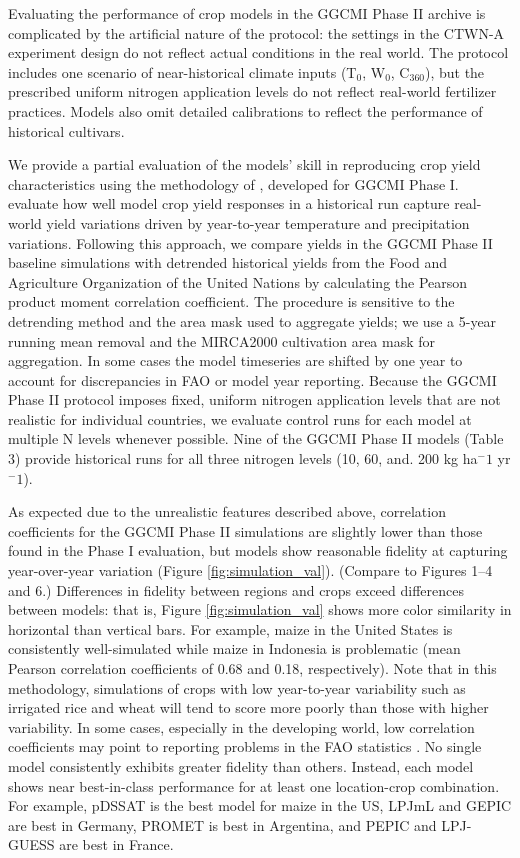 \documentclass[gmd, manuscript]{copernicus} %
\begin{document}
Evaluating the performance of crop models in the GGCMI Phase II archive is complicated by the artificial nature of the protocol: the settings in the CTWN-A experiment design do not reflect actual conditions in the real world. 
The protocol includes one scenario of near-historical climate inputs (T$_0$, W$_0$, C$_{360}$), but the prescribed uniform nitrogen application levels do not reflect real-world fertilizer practices. Models also omit detailed calibrations to reflect the performance of historical cultivars. 

We provide a partial evaluation of the models’ skill in reproducing crop yield characteristics using the methodology of \citet{muller_global_2017}, developed for GGCMI Phase I.
\citet{muller_global_2017} evaluate how well model crop yield responses in a historical run capture real-world yield variations driven by year-to-year temperature and precipitation variations. 
Following this approach, we compare yields in the GGCMI Phase II baseline simulations with detrended historical yields from the Food and Agriculture Organization of the United Nations \citep{FAOSTAT} by calculating the Pearson product moment correlation coefficient. 
The procedure is sensitive to the detrending method and the area mask used to aggregate yields; we use a 5-year running mean removal and the MIRCA2000 cultivation area mask for aggregation. 
In some cases the model timeseries are shifted by one year to account for discrepancies in FAO or model year reporting. 
Because the GGCMI Phase II protocol imposes fixed, uniform nitrogen application levels that are not realistic for individual countries, we evaluate control runs for each model at multiple N levels whenever possible. 
Nine of the GGCMI Phase II models (Table 3) provide historical runs for all three nitrogen levels (10, 60, and. 200 kg ha$^-1$ yr$^-1$).

As expected due to the unrealistic features described above, correlation coefficients for the GGCMI Phase II simulations are slightly lower than those found in the Phase I evaluation, but models show reasonable fidelity at capturing year-over-year variation (Figure \ref{fig:simulation_val}). 
(Compare to \citet{muller_global_2017} Figures 1--4 and 6.)  
Differences in fidelity between regions and crops exceed differences between models: 
that is, Figure \ref{fig:simulation_val} shows more color similarity in horizontal than vertical bars. 
For example, maize in the United States is consistently well-simulated while maize in Indonesia is problematic (mean Pearson correlation coefficients of 0.68 and 0.18, respectively). 
Note that in this methodology, simulations of crops with low year-to-year variability such as irrigated rice and wheat will tend to score more poorly than those with higher variability.
In some cases, especially in the developing world, low correlation coefficients may point to reporting problems in the FAO statistics \citep{Ray2012, muller_global_2017}. 
No single model consistently exhibits greater fidelity than others. 
Instead, each model shows near best-in-class performance for at least one location-crop combination. 
For example, pDSSAT is the best model for maize in the US, LPJmL and GEPIC are best in Germany, PROMET is best in Argentina, and PEPIC and LPJ-GUESS are best in France.
\end{document}
